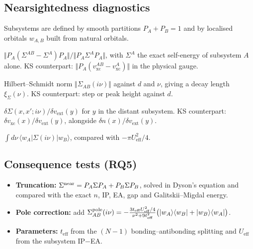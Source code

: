 \documentclass[11pt,a4paper]{article}
\newcommand{\vxc}{v_\mathrm{xc}}
\newcommand{\teff}{t_\mathrm{eff}}
\newcommand{\Ueff}{U_\mathrm{eff}}
\begin{document}
\subsection{Nearsightedness diagnostics}
Subsystems are defined by smooth partitions $P_A+P_B=1$ and by localised orbitals $w_{A,B}$ built from natural orbitals.
\begin{description}[style=nextline,leftmargin=1em,labelindent=0pt]
\item[M1, transferability:] $\Vert P_A(\Sigma^{AB}-\Sigma^{A})P_A\Vert/\Vert P_A\Sigma^AP_A\Vert$, with $\Sigma^A$ the exact self-energy of subsystem $A$ alone. KS counterpart: $\Vert P_A(\vxc^{AB}-\vxc^A)\Vert$ in the physical gauge.
\item[M2, range:] Hilbert--Schmidt norm $\Vert\Sigma_{AB}(i\nu)\Vert$ against $d$ and $\nu$, giving a decay length $\xi_\Sigma(\nu)$. KS counterpart: step or peak height against $d$.
\item[M3, response:] $\delta\Sigma(x,x';i\nu)/\delta v_\mathrm{ext}(y)$ for $y$ in the distant subsystem. KS counterpart: $\delta\vxc(x)/\delta v_\mathrm{ext}(y)$, alongside $\delta n(x)/\delta v_\mathrm{ext}(y)$.
\item[M4, weight:] $\int d\nu\,\langle w_A|\Sigma(i\nu)|w_B\rangle$, compared with $-\pi\Ueff^2/4$.
\end{description}

\subsection{Consequence tests (RQ5)}
\begin{itemize}
\item \textbf{Truncation:} $\Sigma^{\rm near}=P_A\Sigma P_A+P_B\Sigma P_B$, solved in Dyson's equation and compared with the exact $n$, IP, EA, gap and Galitskii--Migdal energy.
\item \textbf{Pole correction:} add
$\Sigma^{\rm pole}_{AB}(i\nu)=-\frac{3\teff\Ueff^2/4}{\nu^2+9\teff^2}\big(|w_A\rangle\langle w_B|+|w_B\rangle\langle w_A|\big)$.
\item \textbf{Parameters:} $\teff$ from the $(N-1)$ bonding--antibonding splitting and $\Ueff$ from the subsystem IP$-$EA.
\end{itemize}
\end{document}
